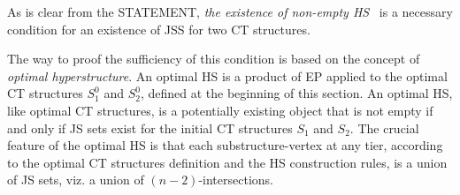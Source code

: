 \documentclass[12pt, a4paper]{article}
\begin{document}
As is clear from the STATEMENT, {\it the existence of non-empty HS} \ is a necessary condition for an existence of JSS for two CT structures.

The way to proof the sufficiency of this condition is based on the concept of {\it optimal hyperstructure}. An optimal HS is a product of EP applied to the optimal CT structures $S_1^0$  and  $S_2^0$,
defined at the beginning of this section. An optimal HS, like optimal CT structures, is a potentially existing object that is not empty if and only if JS sets exist for the initial CT structures
$S_1$ and $S_2$. The crucial feature of the optimal HS is that each substructure-vertex at any tier,
according to the optimal CT structures definition and the HS construction rules, is a union of JS sets, viz. a union of $(n-2)$-intersections.

\begin{figure}[tbp]
\begin{center}
\end{center}
\end{figure}
\end{document}
